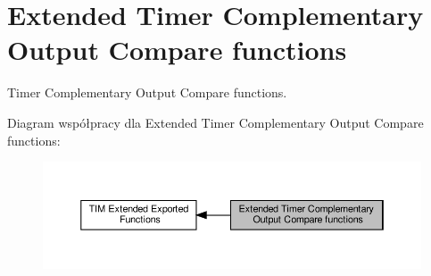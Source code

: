 \hypertarget{group___t_i_m_ex___exported___functions___group2}{}\section{Extended Timer Complementary Output Compare functions}
\label{group___t_i_m_ex___exported___functions___group2}


Timer Complementary Output Compare functions.  


Diagram współpracy dla Extended Timer Complementary Output Compare functions\+:\nopagebreak
\begin{figure}[H]
\begin{center}
\leavevmode
\includegraphics[width=350pt]{group___t_i_m_ex___exported___functions___group2}
\end{center}
\end{figure}
